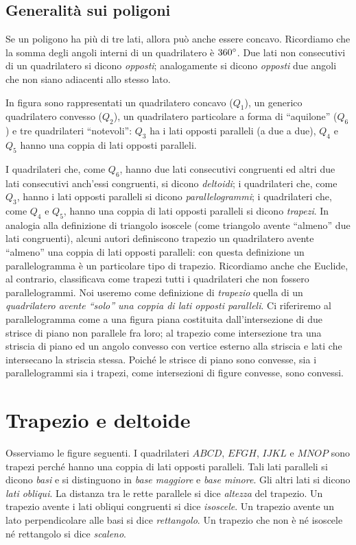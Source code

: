 \subsection{Generalità sui poligoni}

Se un poligono ha più di tre lati, allora può anche essere concavo. Ricordiamo che la somma degli angoli interni di un quadrilatero è $360{}^{\circ}$. Due lati non consecutivi di un quadrilatero si dicono \emph{opposti}; analogamente si dicono \emph{opposti} due angoli che non siano adiacenti allo stesso lato.

In figura sono rappresentati un quadrilatero concavo ($Q_1$), un generico quadrilatero convesso ($Q_2$), un quadrilatero particolare a forma di ``aquilone'' ($Q_6$) e tre quadrilateri ``notevoli'': $Q_3$ ha i lati opposti paralleli (a due a due), $Q_4$ e $Q_5$ hanno una coppia di lati opposti paralleli.

I quadrilateri che, come $Q_6$, hanno due lati consecutivi congruenti ed altri due lati consecutivi anch'essi congruenti, si dicono \emph{deltoidi}; i quadrilateri che, come $Q_3$, hanno i lati opposti paralleli si dicono \emph{parallelogrammi}; i quadrilateri che, come $Q_4$ e $Q_5$, hanno una coppia di lati opposti paralleli si dicono \emph{trapezi}. In analogia alla definizione di triangolo isoscele (come triangolo avente ``almeno'' due lati congruenti), alcuni autori definiscono trapezio un quadrilatero avente ``almeno'' una coppia di lati opposti paralleli: con questa definizione un parallelogramma è un particolare tipo di trapezio. Ricordiamo anche che Euclide, al contrario, classificava come trapezi tutti i quadrilateri che non fossero parallelogrammi.
Noi useremo come definizione di \emph{trapezio} quella di un \emph{quadrilatero avente ``solo'' una coppia di lati opposti paralleli}. Ci riferiremo al parallelogramma come a una figura piana costituita dall'intersezione di due strisce di piano non parallele fra loro; al trapezio come intersezione tra una striscia di piano ed un angolo convesso con vertice esterno alla striscia e lati che intersecano la striscia stessa. Poiché le strisce di piano sono convesse, sia i parallelogrammi sia i trapezi, come intersezioni di figure convesse, sono convessi.

\section{Trapezio e deltoide}

Osserviamo le figure seguenti. I quadrilateri $ABCD$, $EFGH$, $IJKL$ e $MNOP$ sono trapezi perché hanno una coppia di lati opposti paralleli. Tali lati paralleli si dicono \emph{basi} e si distinguono in \emph{base maggiore} e \emph{base minore}. Gli altri lati si dicono \emph{lati obliqui}. La distanza tra le rette parallele si dice \emph{altezza} del trapezio.
Un trapezio avente i lati obliqui congruenti si dice \emph{isoscele}. Un trapezio avente un lato perpendicolare alle basi si dice \emph{rettangolo}. Un trapezio che non è né isoscele né rettangolo si dice \emph{scaleno}.

